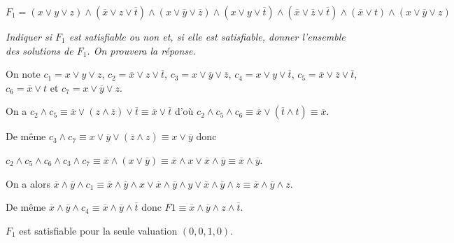 $F_1 = (x \lor y \lor z) \land (\overline x \lor z \lor \overline t) \land (x \lor \overline y \lor \overline z ) \land (x \lor y \lor \overline t) \land (\overline x \lor \overline z \lor \overline t) \land (\overline x \lor t) \land (x \lor \overline y \lor z)$
\begin{Exercise}\it
Indiquer si $F_1$ est satisfiable ou non et, si elle est satisfiable, donner l’ensemble des solutions de $F_1$. On prouvera la réponse.
\end{Exercise}
\begin{Answer}
On note $c_1 = x \lor y \lor z$, $c_2 = \overline x \lor z \lor \overline t$, $c_3 = x \lor \overline y \lor \overline z$, $c_4 = x \lor y \lor \overline t$, $c_5 = \overline x \lor \overline z \lor \overline t$, $c_6 = \overline x \lor t$ et $c_7 = x \lor \overline y \lor z$.

On a $c_2 \land c_5 \equiv \overline x \lor (z \land \overline z) \lor \overline t \equiv \overline x \lor \overline t$
d'où $c_2 \land c_5 \land c_6 \equiv \overline x \lor (\overline t \land t) \equiv \overline x$.

De même $c_3 \land c_7 \equiv x \lor \overline y \lor(\overline z \land z) \equiv x \lor \overline y$ donc

$c_2 \land c_5 \land c_6 \land c_3 \land c_7 \equiv \overline x \land(x \lor \overline y) 
\equiv \overline x \land x \lor \overline  x \land \overline y \equiv \overline x \land \overline y$.

On a alors $\overline x \land \overline y \land c_1 \equiv \overline x \land \overline y \land x \lor
\overline x \land \overline y \land y \lor\overline x \land \overline y \land z
\equiv \overline x \land \overline y \land z$.

De même $\overline x \land \overline y \land c_4 \equiv \overline x \land \overline y \land \overline t$ donc $F1 \equiv
\overline x \land \overline y \land z \land \overline t$.

$F_1$ est satisfiable pour la seule valuation $(0,0,1,0)$.

\end{Answer}
\medskip

